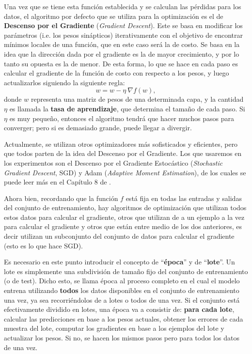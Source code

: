 \documentclass[../../main.tex]{subfiles}
\begin{document}
Una vez que se tiene esta función establecida y se calculan las pérdidas para los datos, el algoritmo por defecto que se utiliza para la optimización es el de \textbf{Descenso por el Gradiente} (\textit{Gradient Descent}). Este se basa en modificar los parámetros (i.e. los pesos sinápticos) iterativamente con el objetivo de encontrar mínimos locales de una función, que en este caso será la de costo. Se basa en la idea que la dirección dada por el gradiente es la de mayor crecimiento, y por lo tanto su opuesta es la de menor. De esta forma, lo que se hace en cada paso es calcular el gradiente de la función de costo con respecto a los pesos, y luego actualizarlos siguiendo la siguiente regla:
\[
w = w - \eta \ \nabla f(w),
\]
donde \(w\) representa una matriz de pesos de una determinada capa, y la cantidad \(\eta\) es llamada la \textbf{tasa de aprendizaje}, que determina el tamaño de cada paso. Si \(\eta\) es muy pequeño, entonces el algoritmo tendrá que hacer muchos pasos para converger; pero si es demasiado grande, puede llegar a divergir. 

Actualmente, se utilizan otros optimizadores más sofisticados y eficientes, pero que todos parten de la idea del Descenso por el Gradiente. Los que usaremos en los experimentos son el Descenso por el Gradiente Estocástico (\textit{Stochastic Gradient Descent}, SGD) y Adam (\textit{Adaptive Moment Estimation}), de los cuales se puede leer más en el Capítulo 8 de \cite{deep-learning}.

Ahora bien, recordando que la función \(f\) está fija en todas las entradas y salidas del conjunto de entrenamiento, hay algoritmos de optimización que utilizan todos estos datos para  calcular el gradiente, otros que utilizan de a un ejemplo a la vez para calcular el gradiente y otros que están entre medio de los dos anteriores, es decir utilizan un subconjunto del conjunto de datos para calcular el gradiente (esto es lo que hace SGD). 

Es necesario en este punto introducir el concepto de ``\textbf{época}'' y de ``\textbf{lote}''. Un lote es simplemente una subdivisión de tamaño fijo del conjunto de entrenamiento (o de test). Dicho esto, se llama época al proceso completo en el cual el modelo entrena utilizando \textbf{todos} los datos disponibles en el conjunto de entrenamiento una vez, ya sea recorriéndolos de a lotes o todos de una vez. Si el conjunto está efectivamente dividido en lotes, una época va a consistir de: \textbf{para cada lote}, calcular las predicciones en base a los pesos actuales, obtener los errores de cada muestra del lote, computar los gradientes en base a los ejemplos del lote y actualizar los pesos. Si no, se hacen los mismos pasos pero para todos los datos de una vez.
\end{document}
